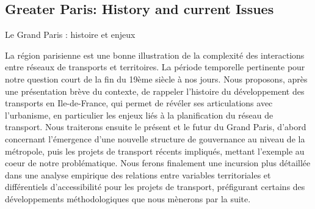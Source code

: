 



\subsection{Greater Paris: History and current Issues}{Le Grand Paris : histoire et enjeux}


La région parisienne est une bonne illustration de la complexité des interactions entre réseaux de transports et territoires. La période temporelle pertinente pour notre question court de la fin du 19ème siècle à nos jours. Nous proposons, après une présentation brève du contexte, de rappeler l'histoire du développement des transports en Ile-de-France, qui permet de révéler ses articulations avec l'urbanisme, en particulier les enjeux liés à la planification du réseau de transport. Nous traiterons ensuite le présent et le futur du Grand Paris, d'abord concernant l'émergence d'une nouvelle structure de gouvernance au niveau de la métropole, puis les projets de transport récents impliqués, mettant l'exemple au coeur de notre problématique. Nous ferons finalement une incursion plus détaillée dans une analyse empirique des relations entre variables territoriales et différentiels d'accessibilité pour les projets de transport, préfigurant certains des développements méthodologiques que nous mènerons par la suite.

